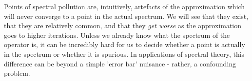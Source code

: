 \documentclass[../main.tex]{subfiles}
\begin{document}
Points of spectral pollution are, intuitively, artefacts of the approximation which will never converge to a point in the actual spectrum. We will see that they exist, that they are relatively common, and that they \emph{get worse} as the approximation goes to higher iterations. Unless we already
know what the spectrum of the operator is, it can be incredibly hard for us to decide whether a point is actually in the spectrum or whether it is
spurious. In applications of spectral theory, this difference can be beyond a simple 'error bar' nuisance - rather, a confounding problem.

\begin{example}
\end{example}
\end{document}
